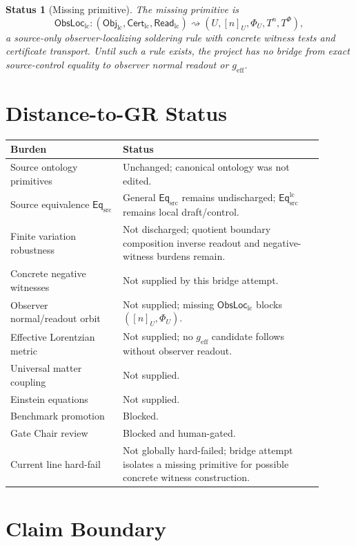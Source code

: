 \documentclass[11pt]{article}
\newcommand{\EqSrc}{\mathsf{Eq}_{\mathrm{src}}}
\newcommand{\EqLC}{\mathsf{Eq}_{\mathrm{src}}^{\mathrm{lc}}}
\newcommand{\ObjLC}{\mathsf{Obj}_{\mathrm{lc}}}
\newcommand{\CertLC}{\mathsf{Cert}_{\mathrm{lc}}}
\newcommand{\ReadLC}{\mathsf{Read}_{\mathrm{lc}}}
\newcommand{\ObsLocLC}{\mathsf{ObsLoc}_{\mathrm{lc}}}
\newcommand{\geff}{g_{\mathrm{eff}}}
\newtheorem{status}{Status}
\begin{document}
\begin{status}[Missing primitive]
The missing primitive is
\[
    \ObsLocLC:
    (\ObjLC,\CertLC,\ReadLC)
    \rightsquigarrow
    (U,[n]_U,\Phi_U,T^n,T^\Phi),
\]
a source-only observer-localizing soldering rule with concrete witness
tests and certificate transport. Until such a rule exists, the project
has no bridge from exact source-control equality to observer normal
readout or \(\geff\).
\end{status}

\section{Distance-to-GR Status}

\begin{center}
\small
\begin{tabular}{p{0.32\linewidth}p{0.58\linewidth}}
\hline
Burden & Status \\
\hline
Source ontology primitives & Unchanged; canonical ontology was not edited. \\
Source equivalence \(\EqSrc\) & General \(\EqSrc\) remains undischarged; \(\EqLC\) remains local draft/control. \\
Finite variation robustness & Not discharged; quotient boundary composition inverse readout and negative-witness burdens remain. \\
Concrete negative witnesses & Not supplied by this bridge attempt. \\
Observer normal/readout orbit & Not supplied; missing \(\ObsLocLC\) blocks \(([n]_U,\Phi_U)\). \\
Effective Lorentzian metric & Not supplied; no \(\geff\) candidate follows without observer readout. \\
Universal matter coupling & Not supplied. \\
Einstein equations & Not supplied. \\
Benchmark promotion & Blocked. \\
Gate Chair review & Blocked and human-gated. \\
Current line hard-fail & Not globally hard-failed; bridge attempt isolates a missing primitive for possible concrete witness construction. \\
\hline
\end{tabular}
\end{center}

\section{Claim Boundary}
\end{document}
